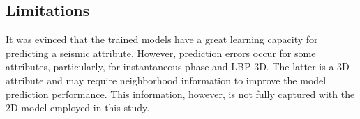 \documentclass[conference]{IEEEtran}
\def\lbp{LBP 3D\xspace}
\begin{document}
%

     

\subsection{Limitations}


It was evinced that the trained models have a great learning capacity for predicting a seismic attribute. However, prediction errors occur for some attributes, particularly, for instantaneous phase and \lbp. The latter is a 3D attribute and may require neighborhood information to improve the model prediction performance. This information, however, is not fully captured with the 2D model employed in this study. 
\end{document}
